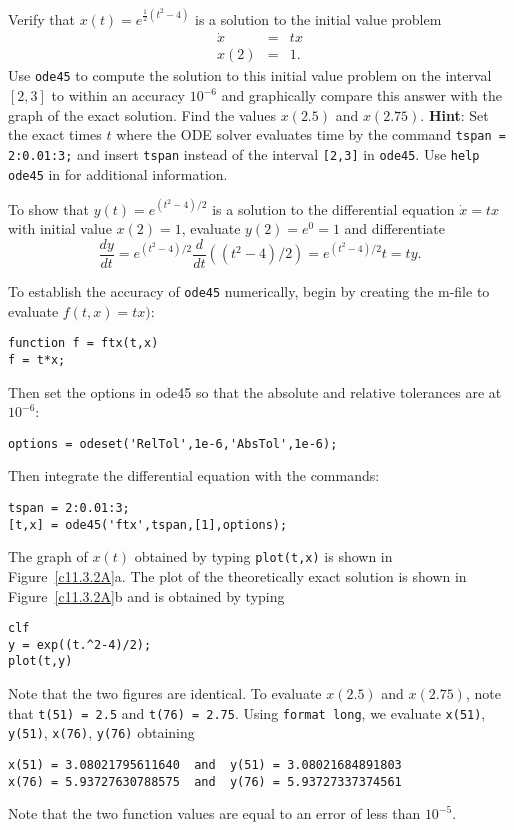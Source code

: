 \documentclass{ximera}
\begin{document}
\begin{exercise} \label{c11.3.2A}
Verify that $x(t) = e^{\frac{1}{2}(t^2-4)}$ is a solution to the initial 
value problem
\[
\begin{array}{rcl}
\dot{x} & = & tx \\
x(2) & = & 1.
\end{array}
\]
Use {\tt ode45} to compute the solution to this initial value problem on the
interval $[2,3]$ to within an accuracy $10^{-6}$ and graphically compare this 
answer with the graph of the exact solution.  Find the values $x(2.5)$ and
$x(2.75)$.  {\bf Hint}: Set the exact times $t$ where the ODE solver 
evaluates time by the command {\tt tspan = 2:0.01:3;} and insert {\tt tspan}
instead of the interval {\tt [2,3]} in {\tt ode45}.  Use {\tt help ode45} in 
\Matlab for additional information. 

\begin{solution}

To show that $y(t)=e^{(t^2-4)/2}$ is a solution to the differential equation
$\dot{x}=tx$ with initial value $x(2)=1$, evaluate $y(2)=e^0=1$ and
differentiate
\[
\frac{dy}{dt} = e^{(t^2-4)/2}\frac{d}{dt}((t^2-4)/2) = 
e^{(t^2-4)/2}t = ty.
\]

To establish the accuracy of {\tt ode45} numerically, begin by creating the 
m-file to evaluate $f(t,x)=tx)$:
\begin{verbatim}
function f = ftx(t,x)
f = t*x;
\end{verbatim}
Then set the options in {\sf ode45} so that the absolute and relative
tolerances are at $10^{-6}$:
\begin{verbatim}
options = odeset('RelTol',1e-6,'AbsTol',1e-6);
\end{verbatim}
Then integrate the differential equation with the commands:
\begin{verbatim}
tspan = 2:0.01:3;
[t,x] = ode45('ftx',tspan,[1],options);
\end{verbatim}
The graph of $x(t)$ obtained by typing {\tt plot(t,x)} is shown in
Figure~\ref{c11.3.2A}a.  The plot of the theoretically exact solution
is shown in Figure~\ref{c11.3.2A}b and is obtained by typing
\begin{verbatim}
clf
y = exp((t.^2-4)/2);
plot(t,y)
\end{verbatim}
Note that the two figures are identical.  To evaluate $x(2.5)$ and $x(2.75)$,
note that {\tt t(51) = 2.5} and {\tt t(76) = 2.75}.  Using {\tt format long}, 
we evaluate {\tt x(51)}, {\tt y(51)}, {\tt x(76)}, {\tt y(76)} obtaining

\begin{verbatim}
x(51) = 3.08021795611640  and  y(51) = 3.08021684891803
x(76) = 5.93727630788575  and  y(76) = 5.93727337374561
\end{verbatim}
Note that the two function values are equal to an error of less than 
$10^{-5}$.

\begin{figure}[htb]
     \centerline{%
     }
\end{figure} 


\end{solution}
\end{exercise}
\end{document}
